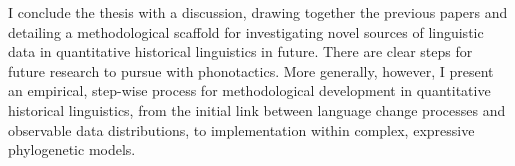 I conclude the thesis with a discussion, drawing together the previous papers and detailing a methodological scaffold for investigating novel sources of linguistic data in quantitative historical linguistics in future. There are clear steps for future research to pursue with phonotactics. More generally, however, I present an empirical, step-wise process for methodological development in quantitative historical linguistics, from the initial link between language change processes and observable data distributions, to implementation within complex, expressive phylogenetic models.


%
